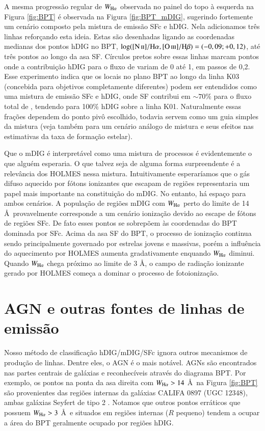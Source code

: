 A mesma progressão regular de $W_{\Ha}$ observada no painel do topo à esquerda na Figura \ref{fig:BPT} é observada na Figura \ref{fig:BPT_mDIG}, sugerindo fortemente um cenário composto pela mistura de emissão SFc e hDIG. Nela adicionamos três linhas reforçando esta ideia. Estas são desenhadas ligando as coordenadas medianas dos pontos hDIG no BPT, $\log(\nii/\Ha,\oiii/\Hb) = (-0,09;+0,12)$, até três pontos ao longo da asa SF. Círculos pretos sobre essas linhas marcam pontos onde a contribuição hDIG para o fluxo de \Ha variam de 0 até 1, em passos de 0,2. Esse experimento indica que os locais no plano BPT ao longo da linha K03 (concebida para objetivos completamente diferentes) podem ser entendidos como uma mistura de emissão SFc e hDIG, onde SF contribui em $\sim 70\%$ para o fluxo total de \Ha, tendendo para 100\% hDIG sobre a linha K01. Naturalmente essas frações dependem do ponto pivô escolhido, todavia servem como um guia simples da mistura (veja também \citealt{Blanc.etal.2009} para um cenário análogo de mistura e seus efeitos nas estimativas da taxa de formação estelar).

Que o mDIG é interpretável como uma mistura de processos é evidentemente o que alguém esperaria. O que talvez seja de alguma forma surpreendente é a relevância dos HOLMES nessa mistura. Intuitivamente esperaríamos que o gás difuso aquecido por fótons ionizantes que escapam de regiões \hii representaria um papel mais importante na constituição do mDIG. No entanto, há espaço para ambos cenários. A população de regiões mDIG com $W_{\Ha}$ perto do limite de 14 \AA\ provavelmente corresponde a um cenário ionização devido ao escape de fótons de regiões SFc. De fato esses pontos se sobrepõem às coordenadas do BPT dominada por SFc. Acima da asa SF do BPT, o processo de ionização continua sendo principalmente governado por estrelas jovens e massivas, porém a influência do aquecimento por HOLMES aumenta gradativamente enquando $W_{\Ha}$ diminui. Quando $W_{\Ha}$ chega próximo ao limite de 3 \AA, o campo de radiação ionizante gerado por HOLMES começa a dominar o processo de fotoionização.


\section{AGN e outras fontes de linhas de emissão}
\label{sec:DIGdisc:caveats}

Nosso método de classificação hDIG/mDIG/SFc ignora outros mecanismos de produção de linhas. Dentre eles, o AGN é o mais notável. AGNs são encontrados nas partes centrais de galáxias e reconhecíveis através do diagrama BPT. Por exemplo, os pontos na ponta da asa direita com $W_{\Ha} > 14$ \AA\ na Figura \ref{fig:BPT} são provenientes das regiões internas da galáxias CALIFA 0897 (UGC 12348), ambas galáxias  Seyfert de tipo 2 \citep{Cusumano.etal.2010, Asmus.etal.2014}. Notamos que outros pontos erráticos que possuem $W_{\Ha} > 3$ \AA\ e situados em regiões internas ($R$ pequeno) tendem a ocupar a área do BPT geralmente ocupado por regiões hDIG.

